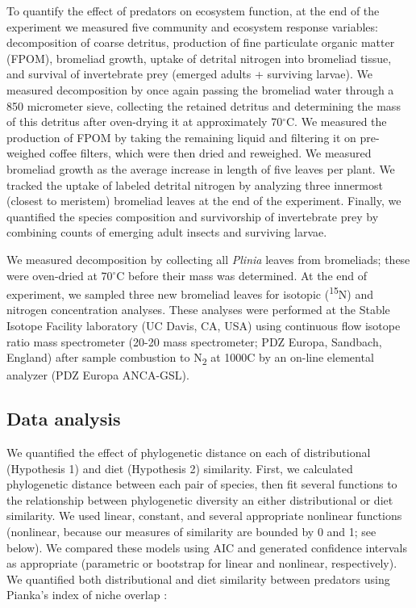 To quantify the effect of predators on ecosystem function, at the end of
the experiment we measured five community and ecosystem response
variables: decomposition of coarse detritus, production of fine
particulate organic matter (FPOM), bromeliad growth, uptake of detrital
nitrogen into bromeliad tissue, and survival of invertebrate prey
(emerged adults + surviving larvae). We measured decomposition by once
again passing the bromeliad water through a 850 micrometer sieve, collecting the
retained detritus and determining the mass of this detritus after
oven-drying it at approximately 70\(^\circ\)C. We measured the
production of FPOM by taking the remaining liquid and filtering it on
pre-weighed coffee filters, which were then dried and reweighed. We
measured bromeliad growth as the average increase in length of five
leaves per plant. We tracked the uptake of labeled detrital nitrogen by
analyzing three innermost (closest to meristem) bromeliad leaves at the
end of the experiment. Finally, we quantified the species composition
and survivorship of invertebrate prey by combining counts of emerging
adult insects and surviving larvae.

We measured decomposition by collecting all \emph{Plinia} leaves from
bromeliads; these were oven-dried at 70\(^\circ\)C before their mass was
determined. At the end of experiment, we sampled three new bromeliad
leaves for isotopic (\textsuperscript{15}N) and nitrogen concentration
analyses. These analyses were performed at the Stable Isotope Facility
laboratory (UC Davis, CA, USA) using continuous flow isotope ratio mass
spectrometer (20-20 mass spectrometer; PDZ Europa, Sandbach, England)
after sample combustion to N\textsubscript{2} at 1000C by an on-line
elemental analyzer (PDZ Europa ANCA-GSL).

\subsection{Data analysis}\label{data-analysis}

We quantified the effect of phylogenetic distance on each of
distributional (Hypothesis 1) and diet (Hypothesis 2) similarity. First,
we calculated phylogenetic distance between each pair of species, then
fit several functions to the relationship between phylogenetic diversity
an either distributional or diet similarity. We used linear, constant,
and several appropriate nonlinear functions (nonlinear, because our
measures of similarity are bounded by 0 and 1; see below). We compared
these models using AIC and generated confidence intervals as appropriate
(parametric or bootstrap for linear and nonlinear, respectively). We
quantified both distributional and diet similarity between predators
using Pianka's index of niche overlap \citep{Pianka1974}:

